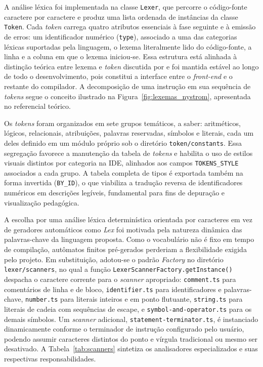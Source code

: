 A análise léxica foi implementada na classe \texttt{Lexer}, que percorre o código-fonte caractere por caractere e produz uma lista ordenada de instâncias da classe \texttt{Token}. Cada \textit{token} carrega quatro atributos essenciais à fase seguinte e à emissão de erros: um identificador numérico (\texttt{type}), associado a uma das categorias léxicas suportadas pela linguagem, o lexema literalmente lido do código-fonte, a linha e a coluna em que o lexema iniciou-se. Essa estrutura está alinhada à distinção teórica entre lexema e \textit{token} discutida por  e foi mantida estável ao longo de todo o desenvolvimento, pois constitui a interface entre o \textit{front-end} e o restante do compilador. A decomposição de uma instrução em sua sequência de \textit{tokens} segue o conceito ilustrado na Figura~\ref{fig:lexemas_nystrom}, apresentada no referencial teórico.

Os \textit{tokens} foram organizados em sete grupos temáticos, a saber: aritméticos, lógicos, relacionais, atribuições, palavras reservadas, símbolos e literais, cada um deles definido em um módulo próprio sob o diretório \texttt{token/constants}. Essa segregação favorece a manutenção da tabela de \textit{tokens} e habilita o uso de estilos visuais distintos por categoria na IDE, alinhados aos campos \texttt{TOKENS\_STYLE} associados a cada grupo. A tabela completa de tipos é exportada também na forma invertida (\texttt{BY\_ID}), o que viabiliza a tradução reversa de identificadores numéricos em descrições legíveis, fundamental para fins de depuração e visualização pedagógica.

A escolha por uma análise léxica determinística orientada por caracteres em vez de geradores automáticos como \textit{Lex} foi motivada pela natureza dinâmica das palavras-chave da linguagem proposta. Como o vocabulário não é fixo em tempo de compilação, autômatos finitos pré-gerados perderiam a flexibilidade exigida pelo projeto. Em substituição, adotou-se o padrão \textit{Factory} no diretório \texttt{lexer/scanners}, no qual a função \texttt{LexerScannerFactory.}\allowbreak\texttt{getInstance()} despacha o caractere corrente para o \textit{scanner} apropriado: \texttt{comment.ts} para comentários de linha e de bloco, \texttt{identifier.ts} para identificadores e palavras-chave, \texttt{number.ts} para literais inteiros e em ponto flutuante, \texttt{string.ts} para literais de cadeia com sequências de escape, e \texttt{symbol-and-}\allowbreak\texttt{operator.ts} para os demais símbolos. Um \textit{scanner} adicional, \texttt{statement-}\allowbreak\texttt{terminator.ts}, é instanciado dinamicamente conforme o terminador de instrução configurado pelo usuário, podendo assumir caracteres distintos do ponto e vírgula tradicional ou mesmo ser desativado. A Tabela~\ref{tab:scanners} sintetiza os analisadores especializados e suas respectivas responsabilidades.

